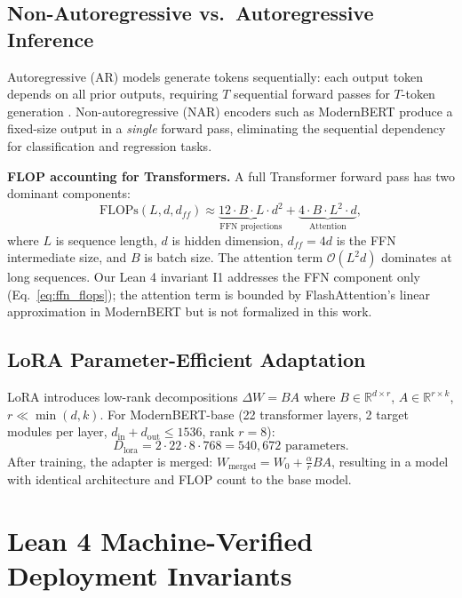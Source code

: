 \documentclass[10pt,journal,compsoc]{IEEEtran}
\theoremstyle{remark}
\begin{document}
\subsection{Non-Autoregressive vs.\ Autoregressive Inference}

Autoregressive (AR) models generate tokens sequentially: each output token depends on all prior outputs, requiring $T$ sequential forward passes for $T$-token generation \cite{gu2017}. Non-autoregressive (NAR) encoders such as ModernBERT produce a fixed-size output in a \emph{single} forward pass, eliminating the sequential dependency for classification and regression tasks.

\textbf{FLOP accounting for Transformers.} A full Transformer forward pass has two dominant components:
\begin{equation}
\text{FLOPs}(L, d, d_{ff}) \approx \underbrace{12 \cdot B \cdot L \cdot d^2}_{\text{FFN projections}} + \underbrace{4 \cdot B \cdot L^2 \cdot d}_{\text{Attention}},
\label{eq:full_flops}
\end{equation}
where $L$ is sequence length, $d$ is hidden dimension, $d_{ff} = 4d$ is the FFN intermediate size, and $B$ is batch size. The attention term $\mathcal{O}(L^2 d)$ dominates at long sequences. Our Lean 4 invariant I1 addresses the FFN component only (Eq.~\ref{eq:ffn_flops}); the attention term is bounded by FlashAttention's linear approximation in ModernBERT but is not formalized in this work.

\subsection{LoRA Parameter-Efficient Adaptation}

LoRA \cite{lora2021} introduces low-rank decompositions $\Delta W = BA$ where $B \in \mathbb{R}^{d \times r}$, $A \in \mathbb{R}^{r \times k}$, $r \ll \min(d, k)$. For ModernBERT-base (22 transformer layers, 2 target modules per layer, $d_\text{in} + d_\text{out} \leq 1536$, rank $r = 8$):
\begin{equation}
D_\text{lora} = 2 \cdot 22 \cdot 8 \cdot 768 = 540{,}672 \text{ parameters}.
\end{equation}
After training, the adapter is merged: $W_\text{merged} = W_0 + \frac{\alpha}{r} BA$, resulting in a model with identical architecture and FLOP count to the base model.

\section{Lean 4 Machine-Verified Deployment Invariants}
\end{document}
